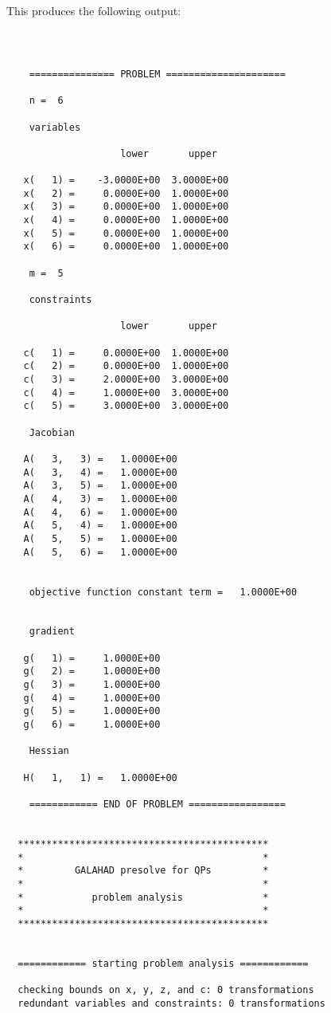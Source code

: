 \documentclass{galahad}
\begin{document}
\noindent
This produces the following output:
{\tt \small
\begin{verbatim}
  
    =============== PROBLEM =====================
  
    n =  6
  
    variables 
  
                    lower       upper
  
   x(   1) =    -3.0000E+00  3.0000E+00
   x(   2) =     0.0000E+00  1.0000E+00
   x(   3) =     0.0000E+00  1.0000E+00
   x(   4) =     0.0000E+00  1.0000E+00
   x(   5) =     0.0000E+00  1.0000E+00
   x(   6) =     0.0000E+00  1.0000E+00
  
    m =  5
  
    constraints 
  
                    lower       upper
  
   c(   1) =     0.0000E+00  1.0000E+00
   c(   2) =     0.0000E+00  1.0000E+00
   c(   3) =     2.0000E+00  3.0000E+00
   c(   4) =     1.0000E+00  3.0000E+00
   c(   5) =     3.0000E+00  3.0000E+00
  
    Jacobian 
  
   A(   3,   3) =   1.0000E+00
   A(   3,   4) =   1.0000E+00
   A(   3,   5) =   1.0000E+00
   A(   4,   3) =   1.0000E+00
   A(   4,   6) =   1.0000E+00
   A(   5,   4) =   1.0000E+00
   A(   5,   5) =   1.0000E+00
   A(   5,   6) =   1.0000E+00
  
  
    objective function constant term =   1.0000E+00
  
  
    gradient 
  
   g(   1) =     1.0000E+00
   g(   2) =     1.0000E+00
   g(   3) =     1.0000E+00
   g(   4) =     1.0000E+00
   g(   5) =     1.0000E+00
   g(   6) =     1.0000E+00
  
    Hessian 
  
   H(   1,   1) =   1.0000E+00
  
    ============ END OF PROBLEM =================
  
  
  ********************************************
  *                                          *
  *         GALAHAD presolve for QPs         *
  *                                          *
  *            problem analysis              *
  *                                          *
  ********************************************
  
  
  ============ starting problem analysis ============
  
  checking bounds on x, y, z, and c: 0 transformations
  redundant variables and constraints: 0 transformations


\end{verbatim}}
\end{document}
